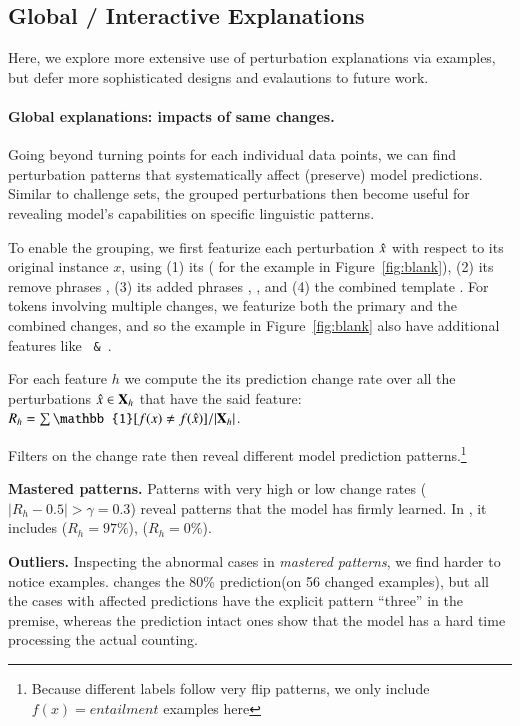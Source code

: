 \subsection{Global / Interactive Explanations}
\label{subsec:global_exp}
Here, we explore more extensive use of perturbation explanations via examples, but defer more sophisticated designs and evalautions to future work.

\paragraph{Global explanations: impacts of same changes.}
Going beyond turning points for each individual data points, we can find perturbation patterns that systematically affect (preserve) model predictions.
Similar to challenge sets, the grouped perturbations then become useful for revealing model's capabilities on specific linguistic patterns.

To enable the grouping, we first featurize each perturbation $\hat{x}$ with respect to its original instance $x$, using 
(1) its \tagstr ( for the example in Figure~\ref{fig:blank}), 
(2) its remove phrases , 
(3) its added phrases , , and 
(4) the combined template .
For tokens involving multiple changes, we featurize both the primary and the combined changes, and so the example in Figure~\ref{fig:blank} also have additional features like \texttt{ \& }.

For each feature $h$ we compute the its prediction change rate over all the perturbations $\hat{x} \in \mathbf{X}_{h}$ that have the said feature: 
$R_h = \sum {\mathbb{1}[f(x) \not\eq f(\xp)]} / |\xset_h|$.

Filters on the change rate then reveal different model prediction patterns.\footnote{Because different \nli labels follow very flip patterns, we only include $f(x)=entailment$ examples here}

\noindent\textbf{Mastered patterns.}
Patterns with very high or low change rates (\eg $|R_h-0.5| > \gamma=0.3$) reveal patterns that the model has firmly learned.
In \nli, it includes  ($R_h=97\%$),  ($R_h=0\%$).

\noindent\textbf{Outliers.}
Inspecting the abnormal cases in \emph{mastered patterns}, we find harder to notice examples.
 changes the 80\% prediction(on 56 changed examples), but all the cases with affected predictions have the explicit pattern ``three'' in the premise, whereas the prediction intact ones show that the model has a hard time processing the actual counting.

